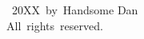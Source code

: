 \vspace*{3in}
\begin{singlespace}
	\begin{center}
		\textcopyright{}~20XX~by~Handsome Dan\\
		All~rights~reserved.
	\end{center}
\end{singlespace}
